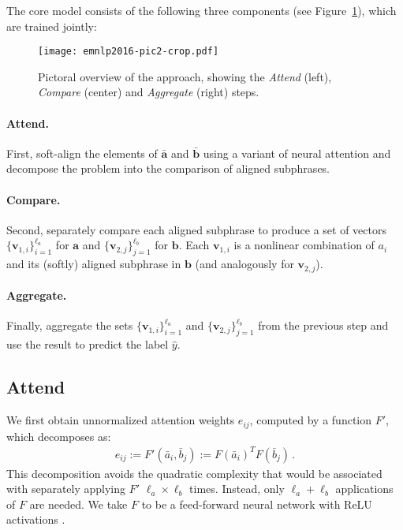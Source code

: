 \documentclass[11pt,letterpaper]{article}
\newcommand{\ab}{\mathbf{a}}
\newcommand{\bb}{\mathbf{b}}
\newcommand{\vb}{\mathbf{v}}
\newcommand{\yhat}{\hat{y}}
\begin{document}
The core model consists of the following three components (see Figure~\ref{fig:overview}), which are trained jointly:

\begin{figure}[!tbp]
\texttt{[image: emnlp2016-pic2-crop.pdf]}
\caption{Pictoral overview of the approach, showing the \emph{Attend} (left), \emph{Compare} (center) and \emph{Aggregate} (right) steps.}
\label{fig:overview}
\vspace{-0.3cm}
\end{figure}


\paragraph{Attend.} First, soft-align the elements of $\bar{\ab}$ and $\bar{\bb}$ using a variant of neural attention \cite{bahdanau2014neural} and decompose the problem into the comparison of aligned subphrases.

\paragraph{Compare.} Second, separately compare each aligned subphrase to produce a set of vectors $\{\vb_{1,i}\}_{i=1}^{\ell_a}$ for $\ab$ and
$\{\vb_{2,j}\}_{j=1}^{\ell_b}$ for $\bb$.
Each $\vb_{1,i}$ is a nonlinear combination of $a_i$ and its (softly) aligned subphrase in $\bb$
(and analogously for $\vb_{2,j}$).

\paragraph{Aggregate.} Finally, aggregate the sets $\{\vb_{1,i}\}_{i=1}^{\ell_a}$ and $\{\vb_{2,j}\}_{j=1}^{\ell_b}$ from the previous step and use the result to predict the label $\yhat$.

\subsection{Attend}
We first obtain unnormalized attention weights $e_{ij}$, computed by a function $F'$, which decomposes as:
\begin{align}\label{eq:unnormalized_attention}
e_{ij} := F'(\bar{a}_i, \bar{b}_j) := F(\bar{a}_i)^{T} F(\bar{b}_j)\,.
\end{align}
This decomposition avoids the quadratic complexity that would be associated with
separately applying $F'$ $\ell_a \times \ell_b$ times. Instead, only $\ell_a + \ell_b$ applications of $F$ are needed.
We take $F$ to be a feed-forward neural network with ReLU activations \cite{glorot2011deep}.
\end{document}
